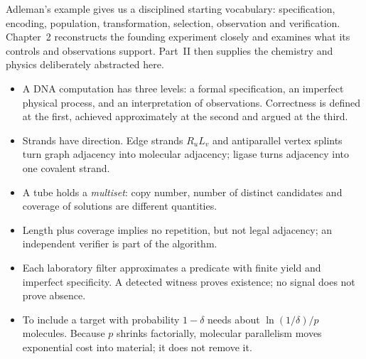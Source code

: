 Adleman's example gives us a disciplined starting vocabulary: specification,
encoding, population, transformation, selection, observation and verification.
Chapter~2 reconstructs the founding experiment closely and examines what its
controls and observations support. Part~II then supplies the chemistry and
physics deliberately abstracted here.

\begin{KeyIdeas}
\begin{itemize}\setlength{\itemsep}{2pt}
\item A DNA computation has three levels: a formal specification, an imperfect
physical process, and an interpretation of observations. Correctness is defined
at the first, achieved approximately at the second and argued at the third.
\item Strands have direction. Edge strands $R_uL_v$ and antiparallel vertex
splints turn graph adjacency into molecular adjacency; ligase turns adjacency
into one covalent strand.
\item A tube holds a \emph{multiset}: copy number, number of distinct candidates and
coverage of solutions are different quantities.
\item Length plus coverage implies no repetition, but not legal adjacency;
an independent verifier is part of the algorithm.
\item Each laboratory filter approximates a predicate with finite yield and
imperfect specificity. A detected witness proves existence; no signal does not
prove absence.
\item To include a target with probability $1-\delta$ needs about
$\ln(1/\delta)/p$ molecules. Because $p$ shrinks factorially, molecular
parallelism moves exponential cost into material; it does not remove it.
\end{itemize}
\end{KeyIdeas}

